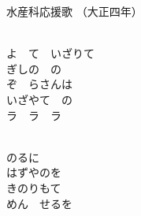 \documentclass[10pt,b5j]{tarticle} %
\begin{document}
\begin{minipage}[c]{0.7\hsize} %
    \begin{center}
        {\LARGE
            水産科応援歌 %
        }
        {\small 
            （大正四年） %
        }
    \end{center}
\end{minipage}
\begin{minipage}[c]{0.3\hsize} %
    \begin{flushright} %
    \end{flushright}
\end{minipage}

\vspace{1.5em} %
\newcommand{\linespace}{0.5em} %
\newcommand{\blocksize}{0.5\hsize} %
\newcommand{\itemmargin}{3em} %
\begin{enumerate} %
    \setlength{\itemindent}{\itemmargin} %
    \begin{minipage}[c]{\blocksize}
    
        \vspace{\linespace}
        \item~\\
        よ　て　いざりて\\
        ぎしの　の\\
        ぞ　らさんは\\
        いざやて　の\\
        ラ　ラ　ラ
        
    \end{minipage}
    \begin{minipage}[c]{\blocksize}
        
        \vspace{\linespace}
        \item~\\
        のるに\\
        はずやのを\\
        きのりもて\\
        めん　せるを
    
    \end{minipage}
\end{enumerate} %
\end{document}
